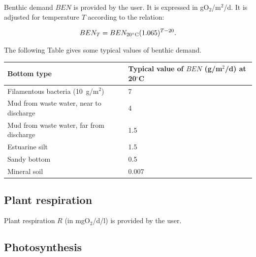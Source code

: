 Benthic demand $BEN$ is provided by the user. It is expressed in gO$_2$/m$^2$/d.
It is adjusted for temperature $T$ according to the relation:

\begin{equation}
  BEN_T = BEN_{20^\circ \rm{C}} (1.065)^{T-20}.
\end{equation}

The following Table gives some typical values of benthic demand.\\

\begin{table}[H]
 			\centering
\begin{tabular}{p{3.0in}p{3.0in}}
\hline
\multicolumn{1}{|p{3.0in}}{Bottom type} & 
\multicolumn{1}{|p{3.0in}|}{Typical value of $BEN$ (g/m$^2$/d) at 20$^{\circ}$C} \\
\hline
\multicolumn{1}{|p{3.0in}}{Filamentous bacteria (10~g/m$^2$)} & 
\multicolumn{1}{|p{3.0in}|}{7} \\
\hline
\multicolumn{1}{|p{3.0in}}{Mud from waste water, near to discharge} & 
\multicolumn{1}{|p{3.0in}|}{4} \\
\hline
\multicolumn{1}{|p{3.0in}}{Mud from waste water, far from discharge } & 
\multicolumn{1}{|p{3.0in}|}{1.5} \\
\hline
\multicolumn{1}{|p{3.0in}}{Estuarine silt} & 
\multicolumn{1}{|p{3.0in}|}{1.5} \\
\hline
\multicolumn{1}{|p{3.0in}}{Sandy bottom} & 
\multicolumn{1}{|p{3.0in}|}{0.5} \\
\hline
\multicolumn{1}{|p{3.0in}}{Mineral soil} & 
\multicolumn{1}{|p{3.0in}|}{0.007} \\
\hline

\end{tabular}
\end{table}

\subsection{Plant respiration}

Plant respiration $R$ (in mgO$_2$/d/l) is provided by the user.

\subsection{Photosynthesis}

